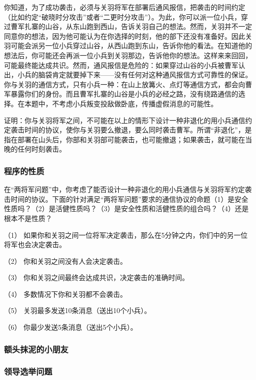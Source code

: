 \documentclass[UTF8,AutoFakeBold=1,AutoFakeSlant,zihao=-4]{cucthesis}
\begin{document}
你知道，为了成功袭击，必须与关羽将军在部署后通风报信，把袭击的时间约定（比如约定“破晓时分攻击”或者“二更时分攻击”）。为此，你可以派一位小兵，穿过曹军扎寨的山谷，从东山跑到西山，告诉关羽自己的想法。然而，关羽并不一定同意你的想法，因为他可能认为在你选择的时刻，他的部下还没有准备好。因此关羽可能会派另一位小兵穿过山谷，从西山跑到东山，告诉你他的看法。在知道他的想法后，你可能还会再派一位小兵到关羽那边，告诉他你的想法。这样来来回回，可能最终能达成共识。然而，通风报信是危险的：如果穿过山谷的小兵被曹军认出，小兵的脑袋肯定就要掉下来——没有任何对这种通风报信方式可靠性的保证。你与关羽的通信方式，只有小兵一种：在山上放篝火、点灯等通信方式，都会向曹军暴露你们的身份。而且曹军扎寨的山谷是小兵的必经之路，没有绕路通信的选择。在本题中，不考虑小兵叛变投敌做卧底，传播虚假消息的可能性。

证明：你与关羽将军之间，不可能在以上的情形下设计一种非退化的用小兵通信约定袭击时间的协议，使你与关羽要么撤退，要么同时袭击曹军。所谓“非退化”，是指在部署在山头后，你部和关羽部可能袭击，也可能撤退；如果袭击，就可能在当晚的任何时刻袭击。

\subsubsection{程序的性质}

在“两将军问题”中，你考虑了能否设计一种非退化的用小兵通信与关羽将军约定袭击时间的协议。下面的针对满足“两将军问题”要求的通信协议的命题（1）是安全性质吗？（2）是活健性质吗？（3）是安全性质和活健性质的组合吗？（4）还是根本不是性质？

（1） 如果你和关羽之间一位将军决定袭击，那么在5分钟之内，你们中的另一位将军也会决定袭击。

（2） 你和关羽之间没有人会决定袭击。

（3） 你和关羽之间最终会达成共识，决定袭击的准确时间。

（4） 多数情况下你和关羽都不会袭击。

（5） 关羽最多发送10条消息（送出10个小兵）。

（6） 你最少发送5条消息（送出5个小兵）。

\subsubsection{额头抹泥的小朋友}

\subsubsection{领导选举问题}
\end{document}
